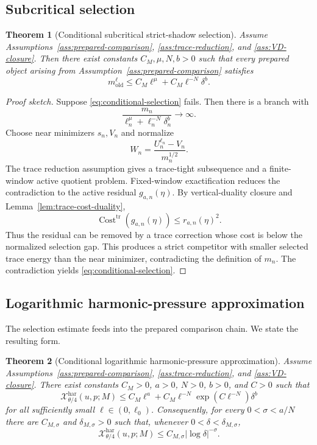 \documentclass[11pt]{article}
\numberwithin{equation}{section}
\newtheorem{theorem}{Theorem}[section]
\DeclareMathOperator{\Cost}{Cost}
\newcommand{\old}{\mathrm{old}}
\newcommand{\har}{\mathrm{har}}
\newcommand{\trc}{\mathrm{tr}}
\newcommand{\calX}{\mathcal X}
\begin{document}
\subsection{Subcritical selection}

\begin{theorem}[Conditional subcritical strict-shadow selection]\label{thm:conditional-selection}
Assume Assumptions~\ref{ass:prepared-comparison}, \ref{ass:trace-reduction}, and \ref{ass:VD-closure}.  Then there exist constants \(C_M,\mu,N,b>0\) such that every prepared object arising from Assumption~\ref{ass:prepared-comparison} satisfies
\begin{equation}\label{eq:conditional-selection}
m^\ell_{\old}
\le
C_M\ell^\mu+C_M\ell^{-N}\delta^b.
\end{equation}
\end{theorem}

\begin{proof}[Proof sketch]
Suppose \eqref{eq:conditional-selection} fails.  Then there is a branch with
\[
\frac{m_n}{\ell_n^\mu+\ell_n^{-N}\delta_n^b}\to\infty.
\]
Choose near minimizers \(s_n,V_n\) and normalize
\[
W_n=\frac{U_n^{\ell_n}-V_n}{m_n^{1/2}}.
\]
The trace reduction assumption gives a trace-tight subsequence and a finite-window active quotient problem.  Fixed-window exactification reduces the contradiction to the active residual \(g_{a,n}(\eta)\).  By vertical-duality closure and Lemma~\ref{lem:trace-cost-duality},
\[
\Cost^{\trc}(g_{a,n}(\eta))
\le r_{a,n}(\eta)^2.
\]
Thus the residual can be removed by a trace correction whose cost is below the normalized selection gap.  This produces a strict competitor with smaller selected trace energy than the near minimizer, contradicting the definition of \(m_n\).  The contradiction yields \eqref{eq:conditional-selection}.
\end{proof}

\subsection{Logarithmic harmonic-pressure approximation}

The selection estimate feeds into the prepared comparison chain.  We state the resulting form.

\begin{theorem}[Conditional logarithmic harmonic-pressure approximation]\label{thm:conditional-log-excess}
Assume Assumptions~\ref{ass:prepared-comparison}, \ref{ass:trace-reduction}, and \ref{ass:VD-closure}.  There exist constants \(C_M>0\), \(a>0\), \(N>0\), \(b>0\), and \(C>0\) such that
\begin{equation}\label{eq:ell-bound}
\calX^{\har}_{\theta/4}(u,p;M)
\le
C_M\ell^a+C_M\ell^{-N}\exp(C\ell^{-N})\delta^b
\end{equation}
for all sufficiently small \(\ell\in(0,\ell_0)\).  Consequently, for every \(0<\sigma<a/N\) there are \(C_{M,\sigma}\) and \(\delta_{M,\sigma}>0\) such that, whenever \(0<\delta<\delta_{M,\sigma}\),
\begin{equation}\label{eq:log-excess}
\calX^{\har}_{\theta/4}(u,p;M)
\le
C_{M,\sigma}|\log\delta|^{-\sigma}.
\end{equation}
\end{theorem}
\end{document}
